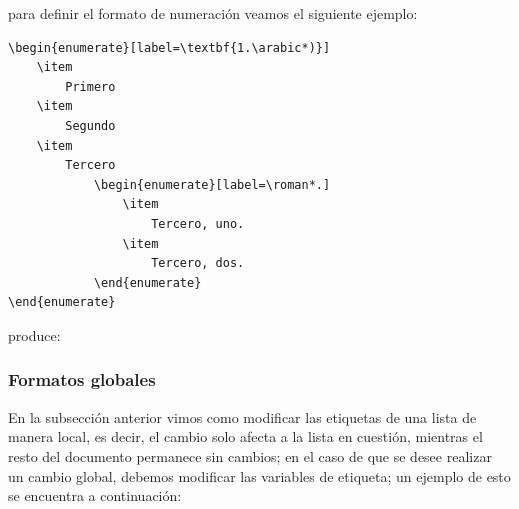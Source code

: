 \documentclass[a4,10pt]{aleph-notas}
\begin{document}
para definir el formato de numeración veamos el siguiente ejemplo:

\begin{lstlisting}[frame=single]
\begin{enumerate}[label=\textbf{1.\arabic*)}]
    \item 
        Primero
    \item 
        Segundo
    \item 
        Tercero
            \begin{enumerate}[label=\roman*.]
                \item 
                    Tercero, uno.
                \item 
                    Tercero, dos.
            \end{enumerate}
\end{enumerate}
\end{lstlisting}

produce:

\begin{center}
{ \fboxsep 12pt
 }
\end{center}

\subsubsection{Formatos globales}

En la subsección anterior vimos como modificar las etiquetas de una lista de manera local, es decir, el cambio solo afecta a la lista en cuestión, mientras el resto del documento permanece sin cambios; en el caso de que se desee realizar un cambio global, debemos modificar las variables de etiqueta; un ejemplo de esto se encuentra a continuación:
\end{document}
